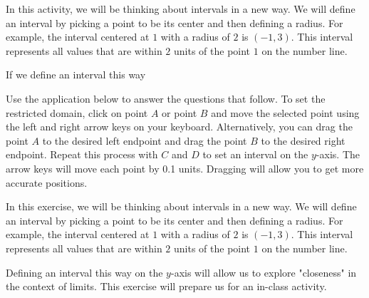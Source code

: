 \documentclass{ximera}
\author{Kevin James}
\begin{document}
   In this activity, we will be thinking about intervals in a new way.  We will define an interval by picking a point to be its center and then defining a radius.  For example, the interval centered at $1$ with a radius of $2$ is $(-1, 3)$.  This interval represents all values that are within $2$ units of the point $1$ on the number line.
   
   If we define an interval this way 
   \begin{exercise}
   	Use the application below to answer the questions that follow.  To set the restricted domain, click on point $ A $ or point $ B $ and move the selected point using the left and right arrow keys on your keyboard.  Alternatively, you can drag the point $ A $ to the desired left endpoint and drag the point $ B $ to the desired right endpoint.  Repeat this process with $ C $ and $ D $ to set an interval on the $y$-axis.  The arrow keys will move each point by 0.1 units.  Dragging will allow you to get more accurate positions.  
    
    \begin{center}
    	\begin{onlineOnly}
    	\end{onlineOnly} 
    \end{center}
    
    In this exercise, we will be thinking about intervals in a new way.  We will define an interval by picking a point to be its center and then defining a radius.  For example, the interval centered at $1$ with a radius of $2$ is $(-1, 3)$.  This interval represents all values that are within $2$ units of the point $1$ on the number line.
    
    Defining an interval this way on the $y$-axis will allow us to explore "closeness" in the context of limits.  This exercise will prepare us for an in-class activity.
    

\end{exercise}
\end{document}
